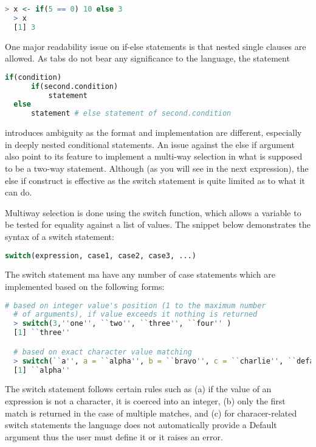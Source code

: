 \documentclass[12pt]{article}
\begin{document}
\begin{lstlisting}[language=R, frame=none]
  > x <- if(5 == 0) 10 else 3
  > x
  [1] 3
\end{lstlisting}

One major readability issue on if-else statements is that nested single clauses are allowed. As tabs do not bear any significance to the language, the statement

\begin{lstlisting}[language=R, frame=none]
  if(condition)
      if(second.condition)
          statement
  else
      statement # else statement of second.condition
\end{lstlisting}

introduces ambiguity as the format and implementation are different, especially in deeply nested conditional statements. An issue against the else if argument also point to its feature to implement a multi-way selection in what is supposed to be a two-way statement. Although (as you will see in the next expression), the else if construct is effective as the switch statement is quite limited as to what it can do.

Multiway selection is done using the switch function, which allows a variable to be tested for equality against a list of values. The snippet below demonstrates the syntax of a switch statement:

\begin{lstlisting}[language=R, frame=none]
  switch(expression, case1, case2, case3, ...)
\end{lstlisting}

 The switch statement ma have any number of case statements which are implemented based on the following forms:

\begin{lstlisting}[language=R, frame=none]
  # based on integer value's position (1 to the maximum number
  # of arguments), if value exceeds it nothing is returned
  > switch(3,''one'', ``two'', ``three'', ``four'' )
  [1] ``three''

  # based on exact character value matching
  > switch(``a'', a = ``alpha'', b = ``bravo'', c = ``charlie'', ``default value'')
  [1] ``alpha''
\end{lstlisting}

The switch statement follows certain rules such as (a) if the value of an expression is not a character, it is coerced into an integer, (b) only the first match is returned in the case of multiple matches, and (c) for characer-related switch statements the language does not automatically provide a Default argument thus the user must define it or it raises an error.
\end{document}
